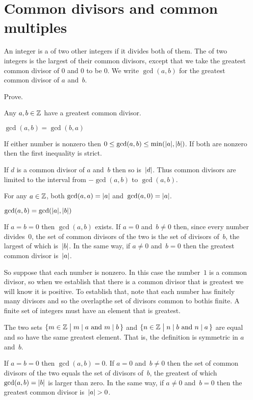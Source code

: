 \documentclass{ibl}  %
\begin{document}
\section{Common divisors and common multiples}

\begin{df}
An integer is a  of two other integers if it
divides both of them.
The  of two integers 
is the largest of their common divisors,
except that we take the greatest common divisor of $0$ and $0$ 
to be $0$.
We write $\gcd(a,b)$ for the greatest common divisor
of $a$ and~$b$.
\end{df}

\begin{ex}
Prove.
\begin{exes} 
\item {} Any $a,b\in\mathbb{Z}$ have a greatest common divisor.
\item {} $\gcd(a,b)=\gcd(b,a)$
\item If either number is nonzero then 
  $0\leq \gcd(a,b)\leq\min(\lvert a\rvert,\lvert b\rvert)$.
  If both are nonzero then the first
  inequality is strict.
\item If $d$ is a common divisor of $a$ and~$b$ then so is~$\lvert d\rvert$.
  Thus common divisors are limited to the interval from $-\gcd(a,b)$
  to $\gcd(a,b)$.
\item For any $a\in\mathbb{Z}$, both $\gcd(a,a)=\lvert a\rvert$ 
  and~$\gcd(a,0)=\lvert a\rvert$.
\item $\gcd(a,b)=\gcd(\lvert a\rvert,\lvert b\rvert)$
\end{exes} 
\begin{ans}
\begin{exes}
\item If $a=b=0$ then $\gcd(a,b)$ exists. 
  If $a=0$ and~$b\neq 0$ then, since every number divides~$0$, the set of 
  common divisors of the two is the set of divisors of~$b$, 
  the largest of which is~$\lvert b\rvert$.
  In the same way, if $a\neq 0$ and~$b=0$ then the greatest common divisor 
  is~$\lvert a\rvert$.

  So suppose that each number is nonzero.
  In this case the number~$1$ is a common divisor, so when we establish that 
  there is a common divisor that is greatest we will know it is positive.
  To establish that, note that each number has finitely many divisors and
  so the overlap\Dash the set of divisors common to both\Dash is finite.
  A finite set of integers must have an element that is greatest.
\item The two sets 
  $\{m\in\mathbb{Z} \bigm| \text{$m\mid a$ and $m\mid b$\,}\}$
  and 
  $\{n\in\mathbb{Z} \bigm| \text{$n\mid b$ and $n\mid a$\,}\}$
  are equal and so have the same greatest element. 
  That is, the definition is symmetric in $a$ and~$b$.
\item If $a=b=0$ then $\gcd(a,b)=0$. 
  If $a=0$ and~$b\neq 0$ then the set of 
  common divisors of the two equals the set of divisors of~$b$, 
  the greatest of which $\gcd(a,b)=\lvert b\rvert$ is larger than zero.
  In the same way, if $a\neq 0$ and~$b=0$ then the greatest common divisor 
  is~$\lvert a\rvert>0$.


\end{exes}
\end{ans}
\end{ex}
\end{document}
